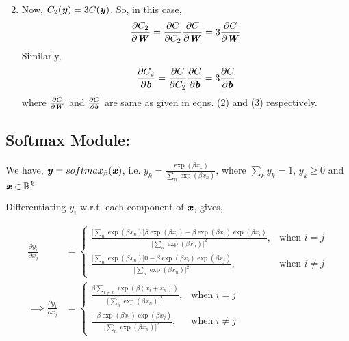 \documentclass{article}
\begin{document}
\begin{enumerate}
\begin{equation}
            \end{equation}\label{dcdb}
    \item Now, $C_{2}(\textbf{\textit{y}})=3C(\textbf{\textit{y}})$. So, in this case,
    \begin{equation}
        \frac{\partial C_{2}}{\partial \textbf{\textit{W}}}=\frac{\partial C}{\partial C_{2}}\frac{\partial C}{\partial \textbf{\textit{W}}}=3\frac{\partial C}{\partial \textbf{\textit{W}}}
    \end{equation}
     Similarly,     \begin{equation}
        \frac{\partial C_{2}}{\partial \textbf{\textit{b}}}=\frac{\partial C}{\partial C_{2}}\frac{\partial C}{\partial \textbf{\textit{b}}}=3\frac{\partial C}{\partial \textbf{\textit{b}}}
    \end{equation}
    where $\frac{\partial C}{\partial \textbf{\textit{W}}}$ and $\frac{\partial C}{\partial \textbf{\textit{b}}}$ are same as given in eqns. (2) and (3) respectively.%
\end{enumerate}

\subsection{Softmax Module:}

We have, $\textbf{\textit{y}}=softmax_{\beta}(\textbf{\textit{x}})$, i.e. $y_{k}=\frac{\exp(\beta x_{k})}{\sum_{n}\exp(\beta x_{n})}$, where $\sum_{k}y_{k}=1$, $y_{k}\geq 0$ and $\textbf{\textit{x}}\in \mathbb{R}^{k}$

Differentiating $y_{i}$ w.r.t. each component of $\textbf{\textit{x}}$, gives,

\begin{equation}
\begin{split}
    \frac{\partial y_{i}}{\partial x_{j}}&=
    \begin{cases}
        \frac{\big[\sum_{n}\exp(\beta x_{n})\big]\beta \exp(\beta x_{i})-\beta\exp(\beta x_{i})\exp(\beta x_{i})}{\big[\sum_{n}\exp(\beta x_{n})\big]^{2}}, &\text{when }i=j\\
        \frac{\big[\sum_{n}\exp(\beta x_{n})\big]0-\beta\exp(\beta x_{i})\exp(\beta x_{j})}{\big[\sum_{n}\exp(\beta x_{n})\big]^{2}}, &\text{when }i\neq j
    \end{cases}\\
    \implies\frac{\partial y_{i}}{\partial x_{j}}&=
    \begin{cases}
        \frac{\beta \sum_{i\neq n}\exp(\beta(x_{i}+x_{n}))}{\big[\sum_{n}\exp(\beta x_{n})\big]^{2}}, &\text{when }i=j\\
        \frac{-\beta\exp(\beta x_{i})\exp(\beta x_{j})}{\big[\sum_{n}\exp(\beta x_{n})\big]^{2}}, &\text{when }i\neq j
    \end{cases}
\end{split}
\end{equation}
\end{document}
